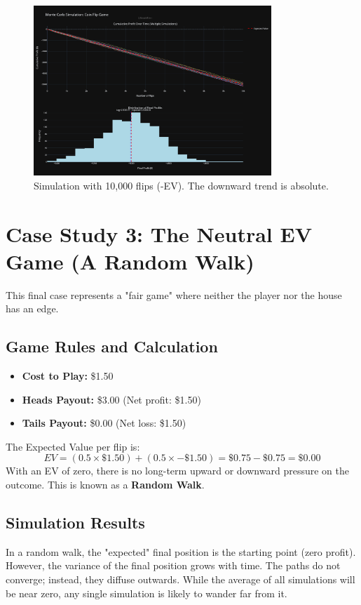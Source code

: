 \documentclass[12pt]{article}
\begin{document}
\begin{figure}[h!]
\centering
\includegraphics[width=0.8\textwidth]{-ev/10k-ev.png}
\caption{Simulation with 10,000 flips (-EV). The downward trend is absolute.}
\end{figure}
\clearpage

\section{Case Study 3: The Neutral EV Game (A Random Walk)}
This final case represents a "fair game" where neither the player nor the house has an edge.

\subsection{Game Rules and Calculation}
\begin{itemize}
    \item \textbf{Cost to Play:} \$1.50
    \item \textbf{Heads Payout:} \$3.00 (Net profit: \$1.50)
    \item \textbf{Tails Payout:} \$0.00 (Net loss: \$1.50)
\end{itemize}
The Expected Value per flip is:
\[
EV = (0.5 \times \$1.50) + (0.5 \times -\$1.50) = \$0.75 - \$0.75 = \boldsymbol{\$0.00}
\]
With an EV of zero, there is no long-term upward or downward pressure on the outcome. This is known as a \textbf{Random Walk}.

\subsection{Simulation Results}
In a random walk, the "expected" final position is the starting point (zero profit). However, the variance of the final position grows with time. The paths do not converge; instead, they diffuse outwards. While the average of all simulations will be near zero, any single simulation is likely to wander far from it.
\end{document}
